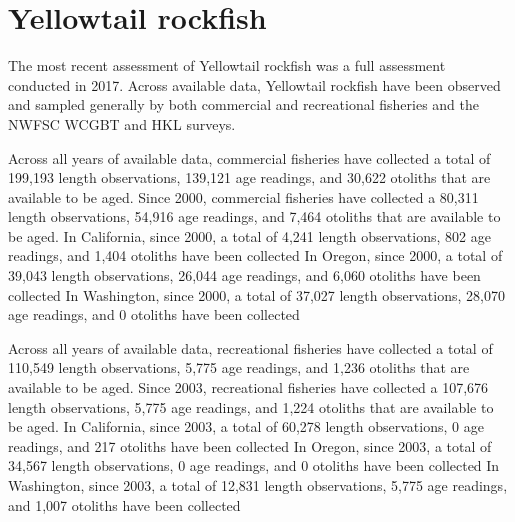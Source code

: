 \documentclass[11pt,
  english,
  letterpaper,
]{article}
\begin{document}

\hypertarget{yellowtail-rockfish}{%
\section{Yellowtail rockfish}\label{yellowtail-rockfish}}

\leavevmode\tagmcend\tagstructend


The most recent assessment of Yellowtail rockfish was a full assessment conducted in 2017. Across available data, Yellowtail rockfish have been observed and sampled generally by both commercial and recreational fisheries and the NWFSC WCGBT and HKL surveys.

\leavevmode\tagmcend\tagstructend\par


Across all years of available data, commercial fisheries have collected a total of 199,193 length observations, 139,121 age readings, and 30,622 otoliths that are available to be aged. Since 2000, commercial fisheries have collected a 80,311 length observations, 54,916 age readings, and 7,464 otoliths that are available to be aged. In California, since 2000, a total of 4,241 length observations, 802 age readings, and 1,404 otoliths have been collected In Oregon, since 2000, a total of 39,043 length observations, 26,044 age readings, and 6,060 otoliths have been collected In Washington, since 2000, a total of 37,027 length observations, 28,070 age readings, and 0 otoliths have been collected

\leavevmode\tagmcend\tagstructend\par


Across all years of available data, recreational fisheries have collected a total of 110,549 length observations, 5,775 age readings, and 1,236 otoliths that are available to be aged. Since 2003, recreational fisheries have collected a 107,676 length observations, 5,775 age readings, and 1,224 otoliths that are available to be aged. In California, since 2003, a total of 60,278 length observations, 0 age readings, and 217 otoliths have been collected In Oregon, since 2003, a total of 34,567 length observations, 0 age readings, and 0 otoliths have been collected In Washington, since 2003, a total of 12,831 length observations, 5,775 age readings, and 1,007 otoliths have been collected
\end{document}
